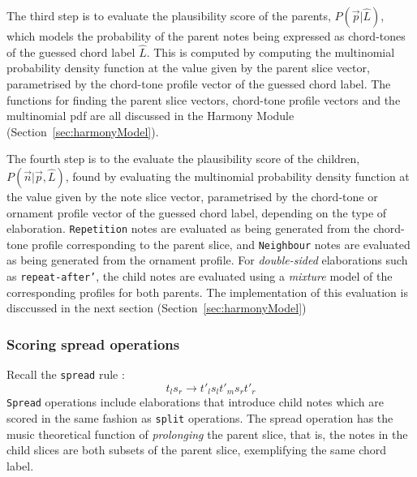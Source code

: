 \documentclass[12pt,a4paper,twoside,openany]{report} \usepackage[pdfborder={0 0 0}]{hyperref}    %
\theoremstyle{definition} \newtheorem{definition}{Definition}[section]
\begin{document}
    The third step is to evaluate the plausibility score of the parents, $P(\vec{p} | \hat{L})$, which models the
    probability of the parent notes being expressed as chord-tones of the guessed chord label $\hat{L}$. 
    This is computed by computing the multinomial probability density function at the value given by the parent slice vector,
    parametrised by the chord-tone profile vector of the guessed chord label. The functions for finding the parent slice
    vectors, chord-tone profile vectors and the multinomial pdf are all discussed in the Harmony Module
    (Section~\ref{sec:harmonyModel}).

    The fourth step is to the evaluate the plausibility score of the children, $P(\vec{n}| \vec{p} , \hat{L})$, found by
    evaluating the multinomial probability density function at the value given by the note slice vector,
    parametrised by the chord-tone or ornament profile vector of the guessed chord label, depending on the type of
    elaboration. \texttt{Repetition} notes are evaluated as being generated from the chord-tone profile corresponding to the parent
    slice, and \texttt{Neighbour} notes are evaluated as being generated from the ornament profile. For
    \textit{double-sided} elaborations such as \texttt{repeat-after'}, the child notes are evaluated using
    a \textit{mixture} model of the corresponding profiles for both parents. The implementation of this evaluation is
    disccussed in the next section (Section~\ref{sec:harmonyModel})

    \subsubsection{Scoring spread operations}
    Recall the \texttt{spread} rule : \[t_l s_r \to t'_l s_l t'_m s_r t'_r\] 
    \texttt{Spread} operations include elaborations that introduce child notes which are scored in the same
    fashion as \texttt{split} operations. The spread operation has the music theoretical function of \textit{prolonging} the parent slice, that is, the
    notes in the child slices are both subsets of the parent slice, exemplifying the same chord label. 

\end{document}
